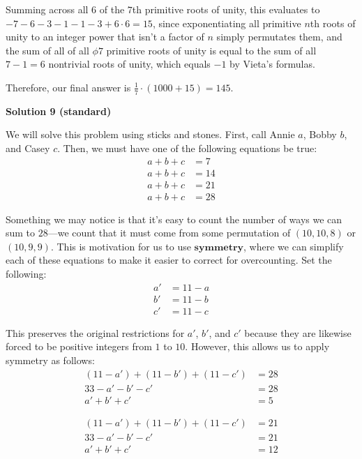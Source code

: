 \begin{enumerate}
 
Summing across all $6$ of the $7$th primitive roots of unity, this evaluates to $-7-6-3-1-1-3+6\cdot6=15$, since exponentiating all primitive $n$th roots of unity to an integer power that isn't a factor of $n$ simply permutates them, and the sum of all of all $\phi{7}$ primitive roots of unity is equal to the sum of all $7-1=6$ nontrivial roots of unity, which equals $-1$ by Vieta's formulas.

 
Therefore, our final answer is $\frac{1}{7} \cdot (1000+15)=\boxed{145}$.

 



\textbf{Solution 9 (standard)}

We will solve this problem using sticks and stones. First, call Annie $a$, Bobby $b$, and Casey $c$. Then, we must have one of the following equations be true:\begin{align*}a+b+c &= 7 \\a+b+c &= 14 \\a+b+c &= 21 \\a+b+c &= 28\end{align*}


 Something we may notice is that it's easy to count the number of ways we can sum to $28$---we count that it must come from some permutation of $(10, 10, 8)$ or $(10, 9, 9)$. This is motivation for us to use $\textbf{symmetry}$, where we can simplify each of these equations to make it easier to correct for overcounting. Set the following:\begin{align*}a' &= 11-a \\b' &= 11-b \\c' &= 11-c\end{align*}


 This preserves the original restrictions for $a'$, $b'$, and $c'$ because they are likewise forced to be positive integers from $1$ to $10$. However, this allows us to apply symmetry as follows:\begin{align*}(11-a')+(11-b')+(11-c') &= 28 \\33-a'-b'-c' &= 28 \\a'+b'+c' &= 5\end{align*}


 \begin{align*}(11-a')+(11-b')+(11-c') &= 21 \\33-a'-b'-c' &= 21 \\a'+b'+c' &= 12\end{align*}



\end{enumerate}
